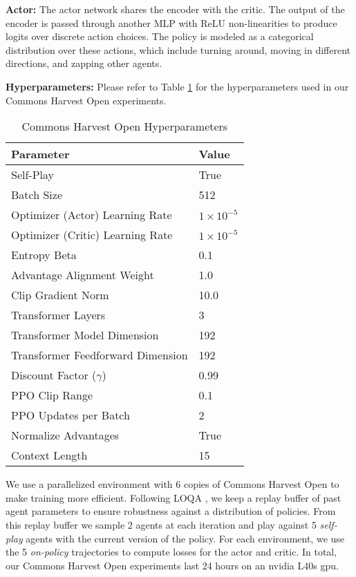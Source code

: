 \documentclass{article} \usepackage{iclr2025_conference,times}
\begin{document}
\textbf{Actor:} The actor network shares the encoder with the critic. The output of the encoder is passed through another MLP with ReLU non-linearities to produce logits over discrete action choices. The policy is modeled as a categorical distribution over these actions, which include turning around, moving in different directions, and zapping other agents.

\textbf{Hyperparameters:} Please refer to Table \ref{tab:commons_harvest} for the hyperparameters used in our Commons Harvest Open experiments.

\begin{table}[h]
\centering
\caption{Commons Harvest Open Hyperparameters}
\label{tab:commons_harvest}
\begin{tabular}{ll}
\textbf{Parameter} & \textbf{Value} \\ \hline
Self-Play & True \\
Batch Size & 512 \\
Optimizer (Actor) Learning Rate & $1 \times 10^{-5}$ \\
Optimizer (Critic) Learning Rate & $1 \times 10^{-5}$ \\
Entropy Beta & 0.1 \\
Advantage Alignment Weight & 1.0 \\
Clip Gradient Norm & 10.0 \\
Transformer Layers & 3 \\
Transformer Model Dimension & 192 \\
Transformer Feedforward Dimension & 192 \\
Discount Factor ($\gamma$) & 0.99 \\
PPO Clip Range & 0.1 \\
PPO Updates per Batch & 2 \\
Normalize Advantages & True \\
Context Length & 15 \\
\end{tabular}
\end{table}

We use a parallelized environment with 6 copies of Commons Harvest Open to make training more efficient. Following LOQA \citep{aghajohari2024loqa}, we keep a replay buffer of past agent parameters to ensure robustness against a distribution of policies. From this replay buffer we sample 2 agents at each iteration and play against 5 \textit{self-play} agents with the current version of the policy. For each environment, we use the 5 \textit{on-policy} trajectories to compute losses for the actor and critic. In total, our Commons Harvest Open experiments last 24 hours on an nvidia L40s gpu. 
\end{document}
